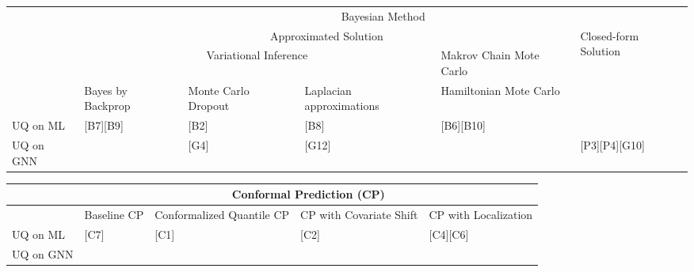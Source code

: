 \documentclass{article}
\begin{document}
\begin{table}[]
\begin{tabular}{|m{1cm} |m{2cm} |m{2cm} |m{2cm} |m{2cm} |m{2cm} |}
\hline
 & \multicolumn{5}{|c|}{Bayesian Method} \\ \cline{1-6}
 & \multicolumn{4}{|c|}{Approximated Solution} & \multirow{3}{2cm}{Closed-form Solution} \\ \cline{1-5}
 & \multicolumn{3}{|c|}{Variational Inference} & Makrov Chain Mote Carlo &  \\ \cline{1-5}
 & Bayes by Backprop & Monte Carlo Dropout & Laplacian approximations & Hamiltonian Mote Carlo &  \\ \hline
UQ on ML & \multicolumn{1}{|l|}{{[}B7{]}{[}B9{]}} & \multicolumn{1}{|l|}{{[}B2{]}} & \multicolumn{1}{|l|}{{[}B8{]}} & {[}B6{]}{[}B10{]} & \multicolumn{1}{|l|}{} \\ \hline
UQ on GNN & \multicolumn{1}{l|}{} & \multicolumn{1}{l|}{{[}G4{]}} & \multicolumn{1}{l|}{{[}G12{]}} &  & \multicolumn{1}{l|}{{[}P3{]}{[}P4{]}{[}G10{]}} \\ \hline
\end{tabular}
\end{table}

\begin{table}[]
\begin{tabular}{|m{2cm} |m{2.5cm} |m{2.5cm} |m{2.5cm} |m{2.5cm} |}
\hline
 & \multicolumn{4}{|c|}{Conformal Prediction (CP)} \\ \hline
 & Baseline CP & Conformalized Quantile CP & CP with Covariate Shift & CP with Localization \\ \hline
UQ on ML & {{[}C7{]}} & {{[}C1{]}} & {{[}C2{]}} & {[}C4{]}{[}C6{]} \\ \hline
UQ on GNN & {} & {} & {} &  \\ \hline
\end{tabular}
\end{table}
\end{document}
